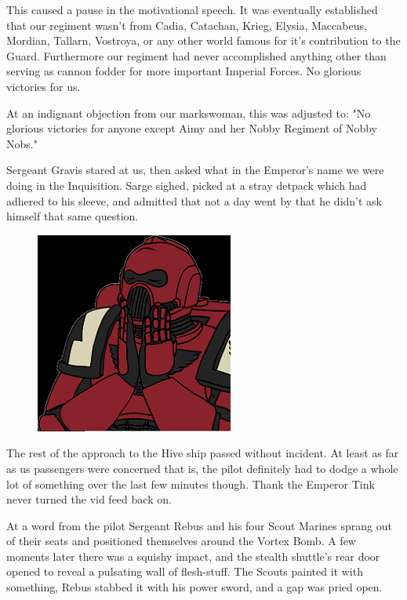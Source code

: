 This caused a pause in the motivational speech. 
It was eventually established that our regiment wasn't from Cadia, Catachan, Krieg, Elysia, Maccabeus, Mordian, Tallarn, Vostroya, or any other world famous for it's contribution to the Guard. 
Furthermore our regiment had never accomplished anything other than serving as cannon fodder for more important Imperial Forces. 
No glorious victories for us.

At an indignant objection from our markswoman, this was adjusted to: 
"No glorious victories for anyone except Aimy and her Nobby Regiment of Nobby Nobs."

Sergeant Gravis stared at us, then asked what in the Emperor's name we were doing in the Inquisition. 
Sarge sighed, picked at a stray detpack which had adhered to his sleeve, and admitted that not a day went by that he didn't ask himself that same question.

\begin{figure}
	\begin{center}
		\includegraphics[width=\figwidth]{pics/12/33.png}
	\end{center}
\end{figure}
The rest of the approach to the Hive ship passed without incident. 
At least as far as us passengers were concerned that is, the pilot definitely had to dodge a whole lot of something over the last few minutes though. 
Thank the Emperor Tink never turned the vid feed back on.

At a word from the pilot Sergeant Rebus and his four Scout Marines sprang out of their seats and positioned themselves around the Vortex Bomb. 
A few moments later there was a squishy impact, and the stealth shuttle's rear door opened to reveal a pulsating wall of flesh-stuff. 
The Scouts painted it with something, Rebus stabbed it with his power sword, and a gap was pried open.

